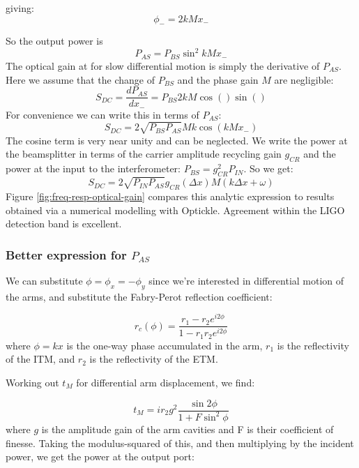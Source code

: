 giving:\[
\phi_{-}=2kMx_{-}\]


So the output power is\begin{equation}
P_{AS}=P_{BS}\sin^{2}kMx_{-}\end{equation}
 The optical gain at for slow differential motion is simply the derivative
of $P_{AS}$. Here we assume that the change of $P_{BS}$ and the
phase gain $M$ are negligible: \begin{equation}
S_{DC}=\frac{dP_{AS}}{dx_{-}}=P_{BS}2kM\cos()\sin()\end{equation}
For convenience we can write this in terms of $P_{AS}$:\begin{equation}
S_{DC}=2\sqrt{P_{BS}P_{AS}}Mk\cos\left(kMx_{-}\right)\end{equation}
The cosine term is very near unity and can be neglected. We write
the power at the beamsplitter in terms of the carrier amplitude recycling
gain $g_{CR}$ and the power at the input to the interferometer: $P_{BS}=g_{CR}^{2}P_{IN}$.
So we get:\begin{equation}
S_{DC}=2\sqrt{P_{IN}P_{AS}}g_{CR}(\Delta x)M(k\Delta x+\omega)\end{equation}
Figure \ref{fig:freq-resp-optical-gain} compares this analytic expression
to results obtained via a numerical modelling with Optickle. Agreement
within the LIGO detection band is excellent.


\subsubsection{Better expression for $P_{AS}$}

We can substitute $\phi=\phi_{x}=-\phi_{y}$ since we're interested
in differential motion of the arms, and substitute the Fabry-Perot
reflection coefficient:

\begin{equation}
r_{c}(\phi)=\frac{r_{1}-r_{2}e^{i2\phi}}{1-r_{1}r_{2}e^{i2\phi}}\end{equation}
where $\phi=kx$ is the one-way phase accumulated in the arm, $r_{1}$
is the reflectivity of the ITM, and $r_{2}$ is the reflectivity of
the ETM.

Working out $t_{M}$ for differential arm displacement, we find:

\begin{equation}
t_{M}=ir_{2}g^{2}\frac{\sin2\phi}{1+F\sin^{2}\phi}\end{equation}
where $g$ is the amplitude gain of the arm cavities and F is their
coefficient of finesse. Taking the modulus-squared of this, and then
multiplying by the incident power, we get the power at the output
port:


